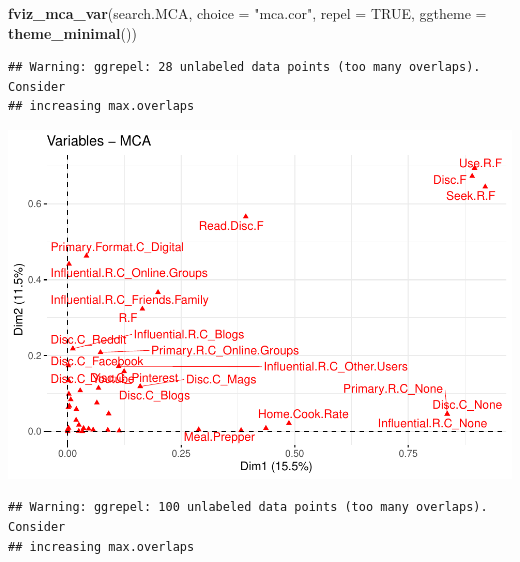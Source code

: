 \documentclass[
]{article}
\newenvironment{Shaded}{\begin{snugshade}}{\end{snugshade}}
\newcommand{\DataTypeTok}[1]{\textcolor[rgb]{0.13,0.29,0.53}{#1}}
\newcommand{\KeywordTok}[1]{\textcolor[rgb]{0.13,0.29,0.53}{\textbf{#1}}}
\newcommand{\NormalTok}[1]{#1}
\newcommand{\OtherTok}[1]{\textcolor[rgb]{0.56,0.35,0.01}{#1}}
\newcommand{\StringTok}[1]{\textcolor[rgb]{0.31,0.60,0.02}{#1}}
\begin{document}
\begin{Shaded}
\begin{Highlighting}[]
\KeywordTok{fviz_mca_var}\NormalTok{(search.MCA, }\DataTypeTok{choice =} \StringTok{"mca.cor"}\NormalTok{, }\DataTypeTok{repel =} \OtherTok{TRUE}\NormalTok{,}
             \DataTypeTok{ggtheme =} \KeywordTok{theme_minimal}\NormalTok{())}
\end{Highlighting}
\end{Shaded}

\begin{verbatim}
## Warning: ggrepel: 28 unlabeled data points (too many overlaps). Consider
## increasing max.overlaps
\end{verbatim}

\includegraphics{Average-User-MCA_files/figure-latex/diet yes social-2.pdf}

\begin{Shaded}
\end{Shaded}

\begin{verbatim}
## Warning: ggrepel: 100 unlabeled data points (too many overlaps). Consider
## increasing max.overlaps
\end{verbatim}
\end{document}

